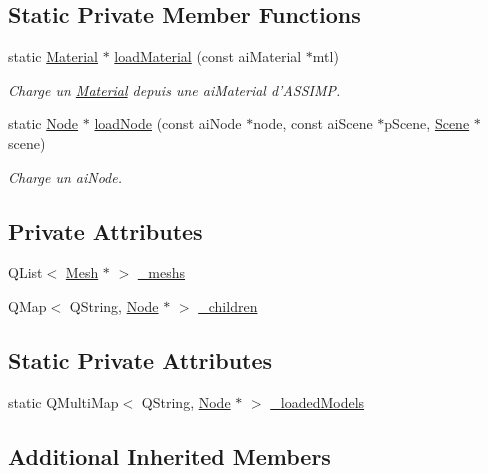 \subsection*{Static Private Member Functions}
\begin{DoxyCompactItemize}
\item 
static \hyperlink{class_material}{Material} $\ast$ \hyperlink{class_node_a0684a35524cc1e276bfefdd28cd452cf}{load\+Material} (const ai\+Material $\ast$mtl)
\begin{DoxyCompactList}\small\item\em Charge un \hyperlink{class_material}{Material} depuis une ai\+Material d'A\+S\+S\+I\+M\+P. \end{DoxyCompactList}\item 
static \hyperlink{class_node}{Node} $\ast$ \hyperlink{class_node_acf6db74c5840b203f4eee1239539ce31}{load\+Node} (const ai\+Node $\ast$node, const ai\+Scene $\ast$p\+Scene, \hyperlink{class_scene}{Scene} $\ast$scene)
\begin{DoxyCompactList}\small\item\em Charge un ai\+Node. \end{DoxyCompactList}\end{DoxyCompactItemize}
\subsection*{Private Attributes}
\begin{DoxyCompactItemize}
\item 
Q\+List$<$ \hyperlink{class_mesh}{Mesh} $\ast$ $>$ \hyperlink{class_node_aad5e459a1ed03d6e09ad7054f2014f5a}{\+\_\+meshs}
\item 
Q\+Map$<$ Q\+String, \hyperlink{class_node}{Node} $\ast$ $>$ \hyperlink{class_node_aac0c3b4b1f41b26ec5a22d77f067ec5b}{\+\_\+children}
\end{DoxyCompactItemize}
\subsection*{Static Private Attributes}
\begin{DoxyCompactItemize}
\item 
static Q\+Multi\+Map$<$ Q\+String, \hyperlink{class_node}{Node} $\ast$ $>$ \hyperlink{class_node_a2e510fe62f9ef864668e32ef9269543c}{\+\_\+loaded\+Models}
\end{DoxyCompactItemize}
\subsection*{Additional Inherited Members}


